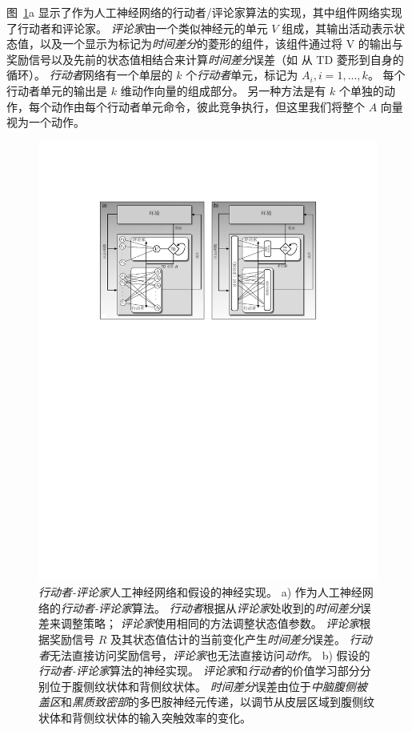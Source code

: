 图~\ref{fig:12_6}a 显示了作为人工神经网络的行动者/评论家算法的实现，其中组件网络实现了行动者和评论家。
\textit{评论家}由一个类似神经元的单元 $V$ 组成，其输出活动表示状态值，以及一个显示为标记为\textit{时间差分}的菱形的组件，该组件通过将 V 的输出与奖励信号以及先前的状态值相结合来计算\textit{时间差分}误差（如 从 TD 菱形到自身的循环）。
\textit{行动者}网络有一个单层的 $k$ 个\textit{行动者}单元，标记为 $A_i, i=1,...,k$。
每个行动者单元的输出是 $k$ 维动作向量的组成部分。 
另一种方法是有 $k$ 个单独的动作，每个动作由每个行动者单元命令，彼此竞争执行，但这里我们将整个 $A$ 向量视为一个动作。


\begin{figure}[!htb]
	\centering
	\includegraphics[width=0.8\linewidth]{chap12/fig_12_6}
	\caption{\textit{行动者-评论家}人工神经网络和假设的神经实现。
		a) 作为人工神经网络的\textit{行动者-评论家}算法。
			\textit{行动者}根据从\textit{评论家}处收到的\textit{时间差分}误差来调整策略；
			\textit{评论家}使用相同的方法调整状态值参数。
			\textit{评论家}根据奖励信号 $R$ 及其状态值估计的当前变化产生\textit{时间差分}误差。
			\textit{行动者}无法直接访问奖励信号，\textit{评论家}也无法直接访问\textit{动作}。
			b) 假设的\textit{行动者-评论家}算法的神经实现。
			\textit{评论家}和\textit{行动者}的价值学习部分分别位于腹侧纹状体和背侧纹状体。
			\textit{时间差分}误差由位于\textit{中脑腹侧被盖区}和\textit{黑质致密部}的多巴胺神经元传递，以调节从皮层区域到腹侧纹状体和背侧纹状体的输入突触效率的变化\cite{takahashi2008silencing}。
		\label{fig:12_6}}
\end{figure}


